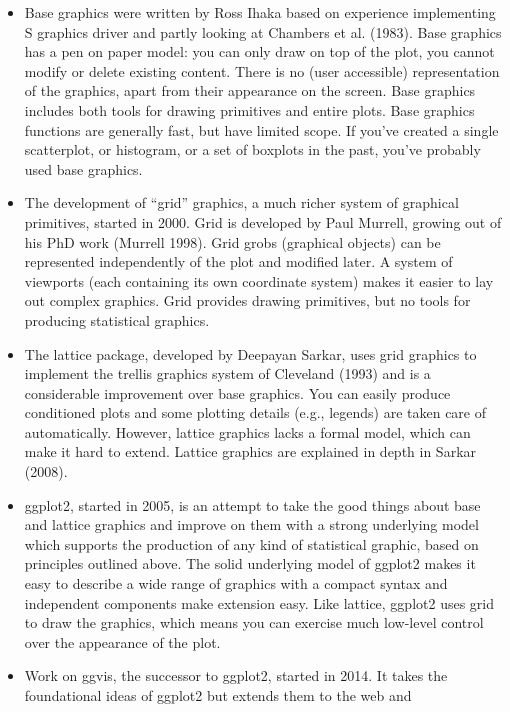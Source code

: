 \begin{itemize}
\item
  Base graphics were written by Ross Ihaka based on experience
  implementing S graphics driver and partly looking at Chambers et al.
  (1983). Base graphics has a pen on paper model: you can only draw on
  top of the plot, you cannot modify or delete existing content. There
  is no (user accessible) representation of the graphics, apart from
  their appearance on the screen. Base graphics includes both tools for
  drawing primitives and entire plots. Base graphics functions are
  generally fast, but have limited scope. If you've created a single
  scatterplot, or histogram, or a set of boxplots in the past, you've
  probably used base graphics. 
\item
  The development of ``grid'' graphics, a much richer system of
  graphical primitives, started in 2000. Grid is developed by Paul
  Murrell, growing out of his PhD work (Murrell 1998). Grid grobs
  (graphical objects) can be represented independently of the plot and
  modified later. A system of viewports (each containing its own
  coordinate system) makes it easier to lay out complex graphics. Grid
  provides drawing primitives, but no tools for producing statistical
  graphics. 
\item
  The lattice package, developed by Deepayan Sarkar, uses grid graphics
  to implement the trellis graphics system of Cleveland (1993) and is a
  considerable improvement over base graphics. You can easily produce
  conditioned plots and some plotting details (e.g., legends) are taken
  care of automatically. However, lattice graphics lacks a formal model,
  which can make it hard to extend. Lattice graphics are explained in
  depth in Sarkar (2008). 
\item
  ggplot2, started in 2005, is an attempt to take the good things about
  base and lattice graphics and improve on them with a strong underlying
  model which supports the production of any kind of statistical
  graphic, based on principles outlined above. The solid underlying
  model of ggplot2 makes it easy to describe a wide range of graphics
  with a compact syntax and independent components make extension easy.
  Like lattice, ggplot2 uses grid to draw the graphics, which means you
  can exercise much low-level control over the appearance of the plot.
\item
  Work on ggvis, the successor to ggplot2, started in 2014. It takes the
  foundational ideas of ggplot2 but extends them to the web and

\end{itemize}
